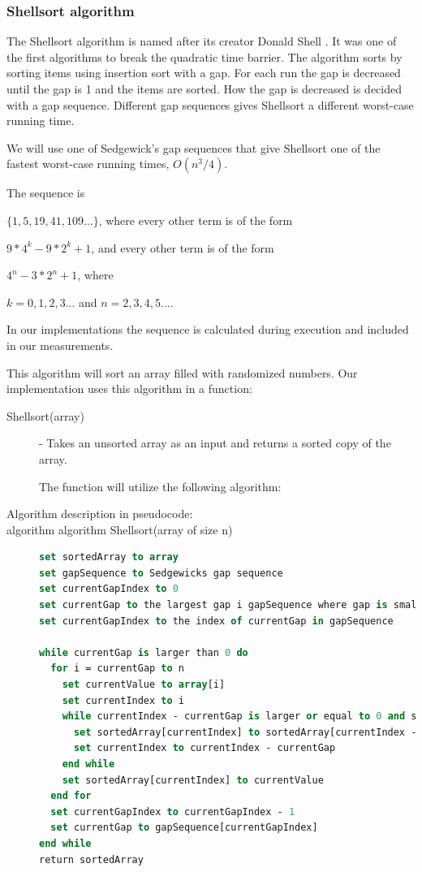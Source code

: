 \documentclass {article}
\begin{document}
\subsubsection{Shellsort algorithm}
The Shellsort algorithm is named after its creator Donald Shell \cite{weiss}. It was one of the first algorithms to break the quadratic time barrier. The algorithm sorts by sorting items using insertion sort with a gap. For each run the gap is decreased until the gap is 1 and the items are sorted. How the gap is decreased is decided with a gap sequence. Different gap sequences gives Shellsort a different worst-case running time.
 
We will use one of Sedgewick's gap sequences that give Shellsort one of the fastest worst-case running times, \(O(n^3/4)\).
 
The sequence is 
 
\(\{1, 5, 19, 41, 109...\}\), where every other term is of the form
 
\(9 * 4^k - 9 * 2^k + 1\), and every other term is of the form
 
\(4^n - 3 * 2^n + 1\), where 
 
\(k = {0, 1, 2, 3...}\) and \(n = {2, 3, 4, 5...}\).
 
In our implementations the sequence is calculated during execution and included in our measurements.
 
This algorithm will sort an array filled with randomized numbers. Our implementation uses this algorithm in a function:
 
\begin{description}
\item[Shellsort(array)] - Takes an unsorted array as an input and returns a sorted copy of the array. 
 
The function will utilize the following algorithm:
\item[Algorithm description in pseudocode:]
\item[algorithm algorithm Shellsort(array of size n)]
\item []
\begin{lstlisting}[language=Pascal]
set sortedArray to array
set gapSequence to Sedgewicks gap sequence
set currentGapIndex to 0
set currentGap to the largest gap i gapSequence where gap is smaller than n divided by 2
set currentGapIndex to the index of currentGap in gapSequence
 
while currentGap is larger than 0 do
  for i = currentGap to n
    set currentValue to array[i]
    set currentIndex to i
    while currentIndex - currentGap is larger or equal to 0 and sortedArray[currentIndex - currentGap] is larger than currentValue do
      set sortedArray[currentIndex] to sortedArray[currentIndex - currentGap]
      set currentIndex to currentIndex - currentGap
    end while
    set sortedArray[currentIndex] to currentValue
  end for
  set currentGapIndex to currentGapIndex - 1
  set currentGap to gapSequence[currentGapIndex]
end while
return sortedArray
\end{lstlisting}
\end{description}
\end{document}
